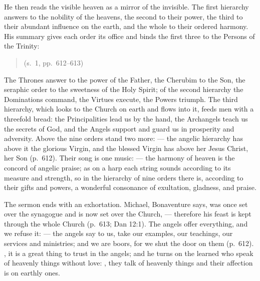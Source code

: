 He then reads the visible heaven as a mirror of the invisible. The first
hierarchy answers to the nobility of the heavens, the second to their
power, the third to their abundant influence on the earth, and the whole to
their ordered harmony. His summary gives each order its office and binds
the first three to the Persons of the Trinity:
\begin{quote}
 (s.~1, pp.~612--613)
\end{quote}
The Thrones answer to the power of the Father, the Cherubim to the Son, the
seraphic order to the sweetness of the Holy Spirit; of the second hierarchy
the Dominations command, the Virtues execute, the Powers triumph. The third
hierarchy, which looks to the Church on earth and flows into it, feeds men
with a threefold bread: the Principalities lead us by the hand, the
Archangels teach us the secrets of God, and the Angels support and guard us
in prosperity and adversity. Above the nine orders stand two more:  --- the angelic hierarchy has above it
the glorious Virgin, and the blessed Virgin has above her Jesus Christ, her
Son (p.~612). Their song is one music:  --- the harmony of heaven is the concord of angelic praise;
as on a harp each string sounds according to its measure and strength, so in
the hierarchy of nine orders there is, according to their gifts and powers,
a wonderful consonance of exultation, gladness, and praise.

The sermon ends with an exhortation. Michael, Bonaventure says, was once set
over the synagogue and is now set over the Church,  --- therefore his feast is kept through
the whole Church (p.~613; Dan 12:1). The angels offer everything, and we
refuse it:  --- the angels say to us, take our examples, our teachings, our
services and ministries; and we are boors, for we shut the door on them
(p.~612). , it is a great thing to
trust in the angels; and he turns on the learned who speak of heavenly
things without love: , they talk of heavenly things and their affection is on earthly
ones.

